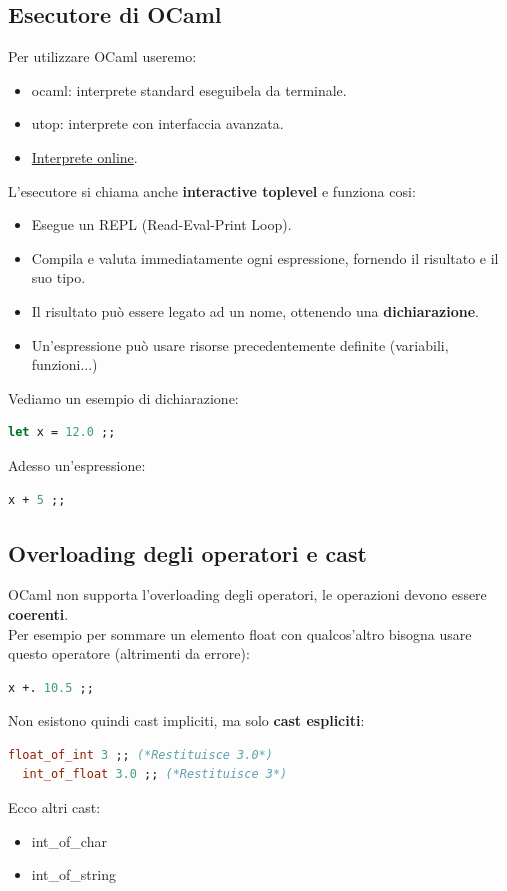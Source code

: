 \documentclass[12pt,a4paper]{article}
\begin{document}
\subsection{Esecutore di OCaml}
Per utilizzare OCaml useremo:
\begin{itemize}
  \item ocaml: interprete standard eseguibela da terminale.
  \item utop: interprete con interfaccia avanzata.
  \item \href{https://try.ocamlpro.com/:}{Interprete online}.
\end{itemize}
L'esecutore si chiama anche \textbf{interactive toplevel} e funziona cosi:
\begin{itemize}
  \item Esegue un REPL (Read-Eval-Print Loop).
  \item Compila e valuta immediatamente ogni espressione, fornendo il risultato e il suo tipo.
  \item Il risultato può essere legato ad un nome, ottenendo una \textbf{dichiarazione}.
  \item Un'espressione può usare risorse precedentemente definite (variabili, funzioni...)
\end{itemize}
Vediamo un esempio di dichiarazione:
\begin{lstlisting}[language=OCaml]
  let x = 12.0 ;;
\end{lstlisting}
Adesso un'espressione:
\begin{lstlisting}[language=OCaml]
  x + 5 ;;
\end{lstlisting}
\subsection{Overloading degli operatori e cast}
OCaml non supporta l'overloading degli operatori, le operazioni devono essere \textbf{coerenti}.\\
Per esempio per sommare un elemento float con qualcos'altro bisogna usare questo operatore (altrimenti da errore):
\begin{lstlisting}[language=OCaml]
  x +. 10.5 ;;
\end{lstlisting}
Non esistono quindi cast impliciti, ma solo \textbf{cast espliciti}:
\begin{lstlisting}[language=OCaml]
  float_of_int 3 ;; (*Restituisce 3.0*)
  int_of_float 3.0 ;; (*Restituisce 3*)
\end{lstlisting}
Ecco altri cast:
\begin{itemize}
  \item int\_of\_char
  \item int\_of\_string
\end{itemize}
\end{document}
